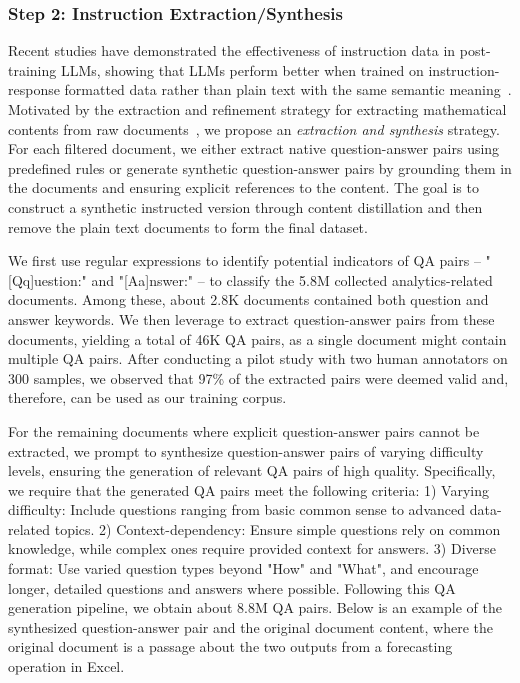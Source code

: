 \subsubsection{Step 2: Instruction Extraction/Synthesis}
Recent studies have demonstrated the effectiveness of instruction data in post-training LLMs, showing that LLMs perform better when trained on instruction-response formatted data rather than plain text with the same semantic meaning~\citep{instruction_pre_training}. Motivated by the extraction and refinement strategy for extracting mathematical contents from raw documents~\citep{yue2024mammoth2}, we propose an \emph{extraction and synthesis} strategy. For each filtered document, we either extract native question-answer pairs using predefined rules or generate synthetic question-answer pairs by grounding them in the documents and ensuring explicit references to the content. The goal is to construct a synthetic instructed version through content distillation and then remove the plain text documents to form the final dataset.


 We first use regular expressions to identify potential indicators of QA pairs -- "[Qq]uestion:" and "[Aa]nswer:" -- to classify the 5.8M collected analytics-related documents. Among these, about 2.8K documents contained both question and answer keywords. We then leverage \claudetf to extract question-answer pairs from these documents, yielding a total of 46K QA pairs, as a single document might contain multiple QA pairs. After conducting a pilot study with two human annotators on 300 samples, we observed that 97\% of the extracted pairs were deemed valid and, therefore, can be used as our training corpus.

 For the remaining documents where explicit question-answer pairs cannot be extracted, we prompt \claudetf to synthesize question-answer pairs of varying difficulty levels, ensuring the generation of relevant QA pairs of high quality. Specifically, we require that the generated QA pairs meet the following criteria: 1) Varying difficulty: Include questions ranging from basic common sense to advanced data-related topics. 2) Context-dependency: Ensure simple questions rely on common knowledge, while complex ones require provided context for answers. 3) Diverse format: Use varied question types beyond "How" and "What", and encourage longer, detailed questions and answers where possible. Following this QA generation pipeline, we obtain about 8.8M QA pairs. Below is an example of the synthesized question-answer pair and the original document content, where the original document is a passage about the two outputs from a forecasting operation in Excel.

